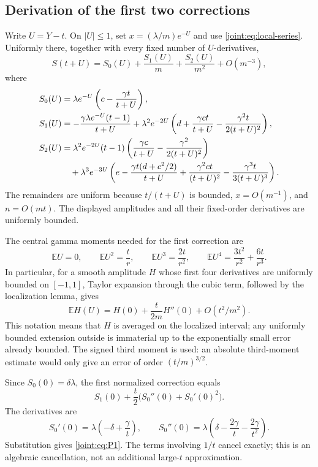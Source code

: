 \subsection{Derivation of the first two corrections}

Write $U=Y-t$. On $|U|\leq1$, set $x=(\lambda/m)e^{-U}$ and use
\eqref{joint:eq:local-series}. Uniformly there, together with every
fixed number of $U$-derivatives,
\begin{equation}\label{joint:eq:S-expansion}
 S(t+U)=S_0(U)+\frac{S_1(U)}m+\frac{S_2(U)}{m^2}+O(m^{-3}),
\end{equation}
where
\begin{align}
 S_0(U)&=\lambda e^{-U}
       \left(c-\frac{\gamma t}{t+U}\right),\notag\\
 S_1(U)&=-\frac{\gamma\lambda e^{-U}(t-1)}{t+U}
  +\lambda^2e^{-2U}
       \left(d+\frac{\gamma ct}{t+U}
                   -\frac{\gamma^2t}{2(t+U)^2}\right),\notag\\
 S_2(U)&=\lambda^2e^{-2U}(t-1)
       \left(\frac{\gamma c}{t+U}
                    -\frac{\gamma^2}{2(t+U)^2}\right)\notag\\
 &\quad+\lambda^3e^{-3U}
       \left(e-\frac{\gamma t(d+c^2/2)}{t+U}
          +\frac{\gamma^2ct}{(t+U)^2}
          -\frac{\gamma^3t}{3(t+U)^3}\right).
 \label{joint:eq:S012}
\end{align}
The remainders are uniform because $t/(t+U)$ is bounded,
$x=O(m^{-1})$, and $n=O(mt)$. The displayed amplitudes and all their
fixed-order derivatives are uniformly bounded.

The central gamma moments needed for the first correction are
\[
 \mathbb EU=0,\qquad
 \mathbb EU^2=\frac tr,\qquad
 \mathbb EU^3=\frac{2t}{r^2},\qquad
 \mathbb EU^4=\frac{3t^2}{r^2}+\frac{6t}{r^3}.
\]
In particular, for a smooth amplitude $H$ whose first four derivatives
are uniformly bounded on $[-1,1]$, Taylor expansion through the cubic
term, followed by the localization lemma, gives
\[
 \mathbb EH(U)=H(0)+\frac{t}{2m}H''(0)
                        +O(t^2/m^2).
\]
This notation means that $H$ is averaged on the localized interval;
any uniformly bounded extension outside is immaterial up to the
exponentially small error already bounded. The signed third moment is used: an absolute
third-moment estimate would only give an error of order
$(t/m)^{3/2}$.

Since $S_0(0)=\delta\lambda$, the first normalized correction equals
\[
 S_1(0)+\frac t2\bigl(S_0''(0)+S_0'(0)^2\bigr).
\]
The derivatives are
\[
 S_0'(0)=\lambda\left(-\delta+\frac\gamma t\right),\qquad
 S_0''(0)=\lambda\left(\delta-\frac{2\gamma}t
                                   -\frac{2\gamma}{t^2}\right).
\]
Substitution gives \eqref{joint:eq:P1}. The terms involving $1/t$
cancel exactly; this is an algebraic cancellation, not an additional
large-$t$ approximation.

